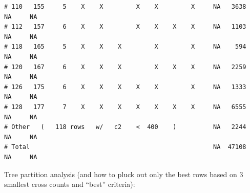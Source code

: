 \documentclass{article}\usepackage[]{graphicx}\usepackage[]{color}
\makeatletter
\newenvironment{kframe}{%
 \def\at@end@of@kframe{}%
 \ifinner\ifhmode%
  \def\at@end@of@kframe{\end{minipage}}%
  \begin{minipage}{\columnwidth}%
 \fi\fi%
 \def\FrameCommand##1{\hskip\@totalleftmargin \hskip-\fboxsep
 \colorbox{shadecolor}{##1}\hskip-\fboxsep
     \hskip-\linewidth \hskip-\@totalleftmargin \hskip\columnwidth}%
 \MakeFramed {\advance\hsize-\width
   \@totalleftmargin\z@ \linewidth\hsize
   \@setminipage}}%
 {\par\unskip\endMakeFramed%
 \at@end@of@kframe}
\newenvironment{knitrout}{}{} %
\makeatother
\begin{document}
\begin{knitrout}
\begin{kframe}
\begin{verbatim}
# 110   155     5    X    X         X    X         X     NA   3638     NA     NA
# 112   157     6    X    X         X    X    X    X     NA   1103     NA     NA
# 118   165     5    X    X    X         X         X     NA    594     NA     NA
# 120   167     6    X    X    X         X    X    X     NA   2259     NA     NA
# 126   175     6    X    X    X    X    X         X     NA   1333     NA     NA
# 128   177     7    X    X    X    X    X    X    X     NA   6555     NA     NA
# Other   (   118 rows   w/   c2    <  400    )          NA   2244     NA     NA
# Total                                                  NA  47108     NA     NA
\end{verbatim}
\end{kframe}
\end{knitrout}

Tree partition analysis (and how to pluck out only the best rows based on 3 smallest cross counts and ``best'' criteria):
\end{document}

